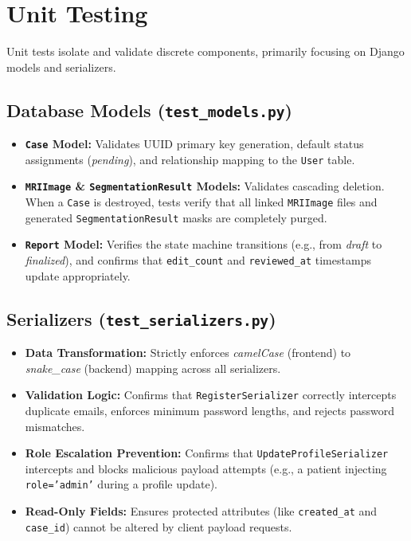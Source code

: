 \documentclass[11pt, a4paper]{article}
\begin{document}
\section{Unit Testing}
Unit tests isolate and validate discrete components, primarily focusing on Django models and serializers.

\subsection{Database Models (\texttt{test\_models.py})}
\begin{itemize}
    \item \textbf{\texttt{Case} Model:} Validates UUID primary key generation, default status assignments (\textit{pending}), and relationship mapping to the \texttt{User} table.
    \item \textbf{\texttt{MRIImage} \& \texttt{SegmentationResult} Models:} Validates cascading deletion. When a \texttt{Case} is destroyed, tests verify that all linked \texttt{MRIImage} files and generated \texttt{SegmentationResult} masks are completely purged.
    \item \textbf{\texttt{Report} Model:} Verifies the state machine transitions (e.g., from \textit{draft} to \textit{finalized}), and confirms that \texttt{edit\_count} and \texttt{reviewed\_at} timestamps update appropriately.
\end{itemize}

\subsection{Serializers (\texttt{test\_serializers.py})}
\begin{itemize}
    \item \textbf{Data Transformation:} Strictly enforces \textit{camelCase} (frontend) to \textit{snake\_case} (backend) mapping across all serializers.
    \item \textbf{Validation Logic:} Confirms that \texttt{RegisterSerializer} correctly intercepts duplicate emails, enforces minimum password lengths, and rejects password mismatches.
    \item \textbf{Role Escalation Prevention:} Confirms that \texttt{UpdateProfileSerializer} intercepts and blocks malicious payload attempts (e.g., a patient injecting \texttt{role='admin'} during a profile update).
    \item \textbf{Read-Only Fields:} Ensures protected attributes (like \texttt{created\_at} and \texttt{case\_id}) cannot be altered by client payload requests.
\end{itemize}
\end{document}
